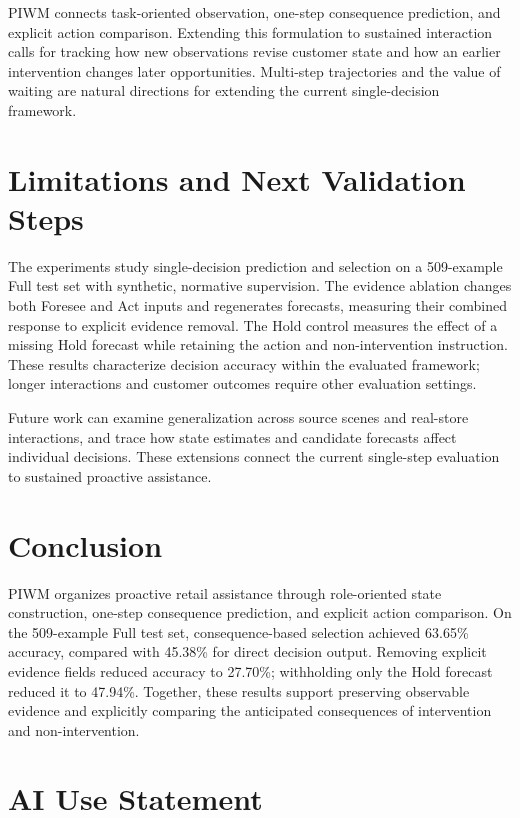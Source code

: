 \documentclass{article}
\begin{document}
PIWM connects task-oriented observation, one-step consequence
prediction, and explicit action comparison. Extending this formulation
to sustained interaction calls for tracking how new observations revise
customer state and how an earlier intervention changes later
opportunities. Multi-step trajectories and the value of waiting are
natural directions for extending the current single-decision framework.

 \vspace{-10pt}

\section{Limitations and Next Validation
Steps}\label{limitations-and-next-validation-steps}

The experiments study single-decision prediction and selection on a
509-example Full test set with synthetic, normative
supervision. The evidence ablation changes both Foresee and Act inputs
and regenerates forecasts, measuring their combined response to explicit
evidence removal. The Hold control measures the effect of a missing Hold
forecast while retaining the action and non-intervention instruction.
These results characterize decision accuracy within the evaluated
framework; longer interactions and customer outcomes require other
evaluation settings.

Future work can examine generalization across source scenes and
real-store interactions, and trace how state estimates and candidate
forecasts affect individual decisions. These extensions connect the
current single-step evaluation to sustained proactive assistance.

\section{Conclusion}\label{conclusion}

PIWM organizes proactive retail assistance through role-oriented state
construction, one-step consequence prediction, and explicit action
comparison. On the 509-example Full test set, consequence-based selection achieved 63.65\%
accuracy, compared with 45.38\% for direct decision output. Removing
explicit evidence fields reduced accuracy to 27.70\%; withholding only
the Hold forecast reduced it to 47.94\%. Together, these results support
preserving observable evidence and explicitly comparing the anticipated
consequences of intervention and non-intervention.

\section{AI Use Statement}\label{ai-use-statement}
\end{document}
